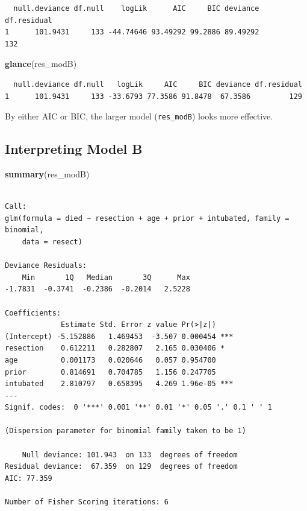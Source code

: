 \documentclass[]{book}
\newenvironment{Shaded}{\begin{snugshade}}{\end{snugshade}}
\newcommand{\KeywordTok}[1]{\textcolor[rgb]{0.13,0.29,0.53}{\textbf{#1}}}
\newcommand{\NormalTok}[1]{#1}
\theoremstyle{definition}
\theoremstyle{definition}
\theoremstyle{definition}
\theoremstyle{remark}
\begin{document}
\begin{verbatim}
  null.deviance df.null    logLik      AIC     BIC deviance df.residual
1      101.9431     133 -44.74646 93.49292 99.2886 89.49292         132
\end{verbatim}

\begin{Shaded}
\begin{Highlighting}[]
\KeywordTok{glance}\NormalTok{(res_modB)}
\end{Highlighting}
\end{Shaded}

\begin{verbatim}
  null.deviance df.null   logLik     AIC     BIC deviance df.residual
1      101.9431     133 -33.6793 77.3586 91.8478  67.3586         129
\end{verbatim}

By either AIC or BIC, the larger model (\texttt{res\_modB}) looks more
effective.

\subsection{Interpreting Model B}\label{interpreting-model-b}

\begin{Shaded}
\begin{Highlighting}[]
\KeywordTok{summary}\NormalTok{(res_modB)}
\end{Highlighting}
\end{Shaded}

\begin{verbatim}

Call:
glm(formula = died ~ resection + age + prior + intubated, family = binomial, 
    data = resect)

Deviance Residuals: 
    Min       1Q   Median       3Q      Max  
-1.7831  -0.3741  -0.2386  -0.2014   2.5228  

Coefficients:
             Estimate Std. Error z value Pr(>|z|)    
(Intercept) -5.152886   1.469453  -3.507 0.000454 ***
resection    0.612211   0.282807   2.165 0.030406 *  
age          0.001173   0.020646   0.057 0.954700    
prior        0.814691   0.704785   1.156 0.247705    
intubated    2.810797   0.658395   4.269 1.96e-05 ***
---
Signif. codes:  0 '***' 0.001 '**' 0.01 '*' 0.05 '.' 0.1 ' ' 1

(Dispersion parameter for binomial family taken to be 1)

    Null deviance: 101.943  on 133  degrees of freedom
Residual deviance:  67.359  on 129  degrees of freedom
AIC: 77.359

Number of Fisher Scoring iterations: 6
\end{verbatim}
\end{document}
